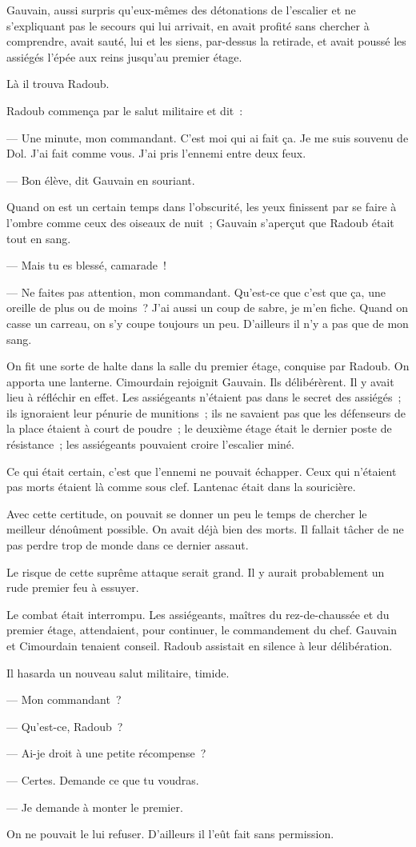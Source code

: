 \documentclass[french,twoside]{book} %
\begin{document}
Gauvain, aussi surpris qu’eux-mêmes des détonations de l’escalier et ne s’expliquant pas le secours qui lui arrivait, en avait profité sans chercher à  comprendre, avait sauté, lui et les siens, par-dessus la retirade, et avait poussé les assiégés l’épée aux reins jusqu’au premier étage.\par
Là il trouva Radoub.\par
Radoub commença par le salut militaire et dit :\par
— Une minute, mon commandant. C’est moi qui ai fait ça. Je me suis souvenu de Dol. J’ai fait comme vous. J’ai pris l’ennemi entre deux feux.\par
— Bon élève, dit Gauvain en souriant.\par
Quand on est un certain temps dans l’obscurité, les yeux finissent par se faire à l’ombre comme ceux des oiseaux de nuit ; Gauvain s’aperçut que Radoub était tout en sang.\par
— Mais tu es blessé, camarade !\par
— Ne faites pas attention, mon commandant. Qu’est-ce que c’est que ça, une oreille de plus ou de moins ? J’ai aussi un coup de sabre, je m’en fiche. Quand on casse un carreau, on s’y coupe toujours un peu. D’ailleurs il n’y a pas que de mon sang.\par
On fit une sorte de halte dans la salle du premier étage, conquise par Radoub. On apporta une lanterne. Cimourdain rejoignit Gauvain. Ils délibérèrent. Il y avait lieu à réfléchir en effet. Les assiégeants n’étaient pas dans le secret des assiégés ; ils ignoraient leur pénurie de munitions ; ils ne savaient pas que les défenseurs de la place étaient à court de poudre ; le deuxième étage était le dernier poste de résistance ; les assiégeants pouvaient croire l’escalier miné.\par
Ce qui était certain, c’est que l’ennemi ne pouvait échapper. Ceux qui n’étaient pas morts étaient là  comme sous clef. Lantenac était dans la souricière.\par
Avec cette certitude, on pouvait se donner un peu le temps de chercher le meilleur dénoûment possible. On avait déjà bien des morts. Il fallait tâcher de ne pas perdre trop de monde dans ce dernier assaut.\par
Le risque de cette suprême attaque serait grand. Il y aurait probablement un rude premier feu à essuyer.\par
Le combat était interrompu. Les assiégeants, maîtres du rez-de-chaussée et du premier étage, attendaient, pour continuer, le commandement du chef. Gauvain et Cimourdain tenaient conseil. Radoub assistait en silence à leur délibération.\par
Il hasarda un nouveau salut militaire, timide.\par
— Mon commandant ?\par
— Qu’est-ce, Radoub ?\par
— Ai-je droit à une petite récompense ?\par
— Certes. Demande ce que tu voudras.\par
— Je demande à monter le premier.\par
On ne pouvait le lui refuser. D’ailleurs il l’eût fait sans permission.
\end{document}
